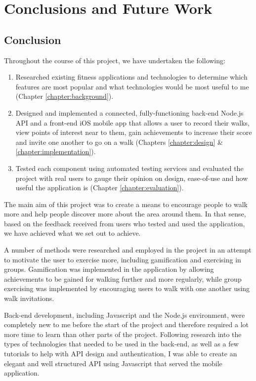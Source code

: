 \chapter{Conclusions and Future Work}

\section{Conclusion}

Throughout the course of this project, we have undertaken the following:

\begin{enumerate}
  \item Researched existing fitness applications and technologies to determine which features are most popular and what technologies would be most useful to me (Chapter \ref{chapter:background}).
  \item Designed and implemented a connected, fully-functioning back-end Node.js API and a front-end iOS mobile app that allows a user to record their walks, view points of interest near to them, gain achievements to increase their score and invite one another to go on a walk (Chapters \ref{chapter:design} \& \ref{chapter:implementation}).
  \item Tested each component using automated testing services and evaluated the project with real users to gauge their opinion on design, ease-of-use and how useful the application is (Chapter \ref{chapter:evaluation}).
\end{enumerate}

The main aim of this project was to create a means to encourage people to walk more and help people discover more about the area around them. In that sense, based on the feedback received from users who tested and used the application, we have achieved what we set out to achieve.

A number of methods were researched and employed in the project in an attempt to motivate the user to exercise more, including gamification and exercising in groups. Gamification was implemented in the application by allowing achievements to be gained for walking further and more regularly, while group exercising was implemented by encouraging users to walk with one another using walk invitations. 

Back-end development, including Javascript and the Node.js environment, were completely new to me before the start of the project and therefore required a lot more time to learn than other parts of the project. Following research into the types of technologies that needed to be used in the back-end, as well as a few tutorials to help with API design and authentication, I was able to create an elegant and well structured API using Javascript that served the mobile application.

